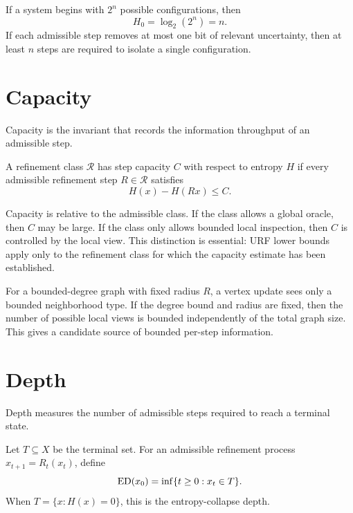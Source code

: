 \begin{example}
If a system begins with \(2^n\) possible configurations, then
\[
H_0=\log_2(2^n)=n.
\]
If each admissible step removes at most one bit of relevant uncertainty, then
at least \(n\) steps are required to isolate a single configuration.
\end{example}

\section{Capacity}

Capacity is the invariant that records the information throughput of an
admissible step.

\begin{definition}
A refinement class \(\mathcal R\) has step capacity \(C\) with respect to
entropy \(H\) if every admissible refinement step \(R\in\mathcal R\) satisfies
\[
H(x)-H(Rx)\le C.
\]
\end{definition}

Capacity is relative to the admissible class. If the class allows a global
oracle, then \(C\) may be large. If the class only allows bounded local
inspection, then \(C\) is controlled by the local view. This distinction is
essential: URF lower bounds apply only to the refinement class for which the
capacity estimate has been established.

\begin{example}
For a bounded-degree graph with fixed radius \(R\), a vertex update sees only
a bounded neighborhood type. If the degree bound and radius are fixed, then
the number of possible local views is bounded independently of the total graph
size. This gives a candidate source of bounded per-step information.
\end{example}

\section{Depth}

Depth measures the number of admissible steps required to reach a terminal
state.

\begin{definition}[EntropyDepth]
Let \(T\subseteq X\) be the terminal set. For an admissible refinement process
\(x_{t+1}=R_t(x_t)\), define
\[
\mathrm{ED}(x_0)=\inf\{t\ge 0:x_t\in T\}.
\]
When \(T=\{x:H(x)=0\}\), this is the entropy-collapse depth.
\end{definition}

